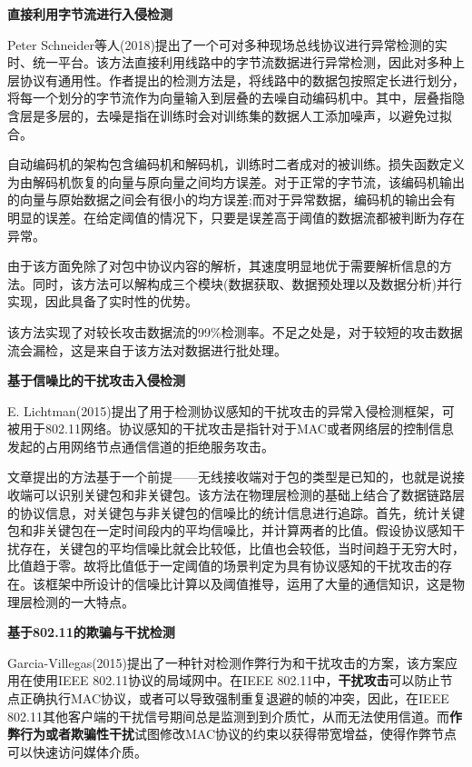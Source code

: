\documentclass[12pt]{article} %
\begin{document}
\textbf{直接利用字节流进行入侵检测}

Peter Schneider等人(2018)\cite{cyber_phy}提出了一个可对多种现场总线协议进行异常检测的实时、统一平台。该方法直接利用线路中的字节流数据进行异常检测，因此对多种上层协议有通用性。作者提出的检测方法是，将线路中的数据包按照定长进行划分，将每一个划分的字节流作为向量输入到层叠的去噪自动编码机中。其中，层叠指隐含层是多层的，去噪是指在训练时会对训练集的数据人工添加噪声，以避免过拟合。

自动编码机的架构包含编码机和解码机，训练时二者成对的被训练。损失函数定义为由解码机恢复的向量与原向量之间均方误差。对于正常的字节流，该编码机输出的向量与原始数据之间会有很小的均方误差;而对于异常数据，编码机的输出会有明显的误差。在给定阈值的情况下，只要是误差高于阈值的数据流都被判断为存在异常。

由于该方面免除了对包中协议内容的解析，其速度明显地优于需要解析信息的方法。同时，该方法可以解构成三个模块(数据获取、数据预处理以及数据分析)并行实现，因此具备了实时性的优势。

该方法实现了对较长攻击数据流的99\%检测率。不足之处是，对于较短的攻击数据流会漏检，这是来自于该方法对数据进行批处理。

\textbf{基于信噪比的干扰攻击入侵检测}

E. Lichtman(2015)\cite{Lichtman}提出了用于检测协议感知的干扰攻击的异常入侵检测框架，可被用于802.11网络。协议感知的干扰攻击是指针对于MAC或者网络层的控制信息发起的占用网络节点通信信道的拒绝服务攻击。

文章提出的方法基于一个前提——无线接收端对于包的类型是已知的，也就是说接收端可以识别关键包和非关键包。该方法在物理层检测的基础上结合了数据链路层的协议信息，对关键包与非关键包的信噪比的统计信息进行追踪。首先，统计关键包和非关键包在一定时间段内的平均信噪比，并计算两者的比值。假设协议感知干扰存在，关键包的平均信噪比就会比较低，比值也会较低，当时间趋于无穷大时，比值趋于零。故将比值低于一定阈值的场景判定为具有协议感知的干扰攻击的存在。该框架中所设计的信噪比计算以及阈值推导，运用了大量的通信知识，这是物理层检测的一大特点。

\textbf{基于802.11的欺骗与干扰检测}

Garcia-Villegas(2015)\cite{Garcia-Villegas}提出了一种针对检测作弊行为和干扰攻击的方案，该方案应用在使用IEEE 802.11协议的局域网中。在IEEE 802.11中，\textbf{干扰攻击}可以防止节点正确执行MAC协议，或者可以导致强制重复退避的帧的冲突，因此，在IEEE 802.11其他客户端的干扰信号期间总是监测到到介质忙，从而无法使用信道。而\textbf{作弊行为或者欺骗性干扰}试图修改MAC协议的约束以获得带宽增益，使得作弊节点可以快速访问媒体介质。
\end{document}
